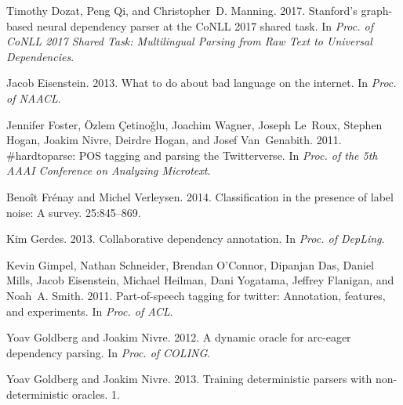 \documentclass[11pt,a4paper]{article}
\begin{document}
\begin{thebibliography}{}
	Timothy Dozat, Peng Qi, and Christopher~D. Manning. 2017.
	\newblock Stanford's graph-based neural dependency parser at the {CoNLL} 2017
	shared task.
	\newblock In {\em Proc. of CoNLL 2017 Shared Task: Multilingual Parsing from
		Raw Text to Universal Dependencies\/}.
	
	Jacob Eisenstein. 2013.
	\newblock What to do about bad language on the internet.
	\newblock In {\em Proc. of NAACL\/}.
	
	Jennifer Foster, \"{O}zlem \c{C}etino\v{g}lu, Joachim Wagner, Joseph Le~Roux,
	Stephen Hogan, Joakim Nivre, Deirdre Hogan, and Josef Van~Genabith. 2011.
	\newblock \#hardtoparse: {POS} tagging and parsing the {Twitterverse}.
	\newblock In {\em Proc. of the 5th AAAI Conference on Analyzing Microtext\/}.
	
	Beno{\^i}t Fr{\'e}nay and Michel Verleysen. 2014.
	\newblock Classification in the presence of label noise: A survey.
	25:845--869.
	
	Kim Gerdes. 2013.
	\newblock Collaborative dependency annotation.
	\newblock In {\em Proc. of DepLing\/}.
	
	Kevin Gimpel, Nathan Schneider, Brendan O'Connor, Dipanjan Das, Daniel Mills,
	Jacob Eisenstein, Michael Heilman, Dani Yogatama, Jeffrey Flanigan, and
	Noah~A. Smith. 2011.
	\newblock Part-of-speech tagging for twitter: Annotation, features, and
	experiments.
	\newblock In {\em Proc. of ACL\/}.
	
	Yoav Goldberg and Joakim Nivre. 2012.
	\newblock A dynamic oracle for arc-eager dependency parsing.
	\newblock In {\em Proc. of COLING\/}.
	
	Yoav Goldberg and Joakim Nivre. 2013.
	\newblock Training deterministic parsers with non-deterministic oracles.
	 1.
	

\end{thebibliography}
\end{document}
